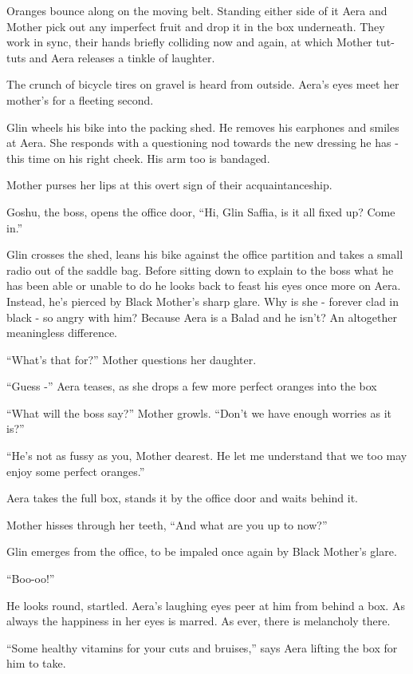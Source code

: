 \documentclass[twoside,11pt]{book}
\begin{document}
Oranges bounce along on the moving belt. Standing either side of it Aera and Mother pick out any imperfect fruit and
drop it in the box underneath. They work in sync, their hands briefly colliding now and again, at which Mother tut-tuts
and Aera releases a tinkle of laughter.

The crunch of bicycle tires on gravel is heard from outside. Aera's eyes meet her mother's for a fleeting second.

Glin wheels his bike into the packing shed. He removes his earphones and smiles at Aera. She responds with a questioning
nod towards the new dressing he has - this time on his right cheek. His arm too is bandaged.

Mother purses her lips at this overt sign of their acquaintanceship.

Goshu, the boss, opens the office door, ``Hi, Glin Saffia, is it all fixed up? Come in.''

Glin crosses the shed, leans his bike against the office partition and takes a small radio out of the saddle bag. Before
sitting down to explain to the boss what he has been able or unable to do he looks back to feast his eyes once more on
Aera. Instead, he's pierced by Black Mother's sharp glare. Why is she - forever clad in black - so angry with him?
Because Aera is a Balad and he isn't? An altogether meaningless difference.

``What's that for?'' Mother questions her daughter.

``Guess -'' Aera teases, as she drops a few more perfect oranges into the box

``What will the boss say?'' Mother growls. ``Don't we have enough worries as it
is?''

``He's not as fussy as you, Mother dearest. He let me understand that we too may enjoy some perfect
oranges.''

Aera takes the full box, stands it by the office door and waits behind it.

Mother hisses through her teeth, ``And what are you up to now?''

Glin emerges from the office, to be impaled once again by Black Mother's glare.

``Boo-oo!''

He looks round, startled. Aera's laughing eyes peer at him from behind a box. As always the happiness in her eyes is
marred. As ever, there is melancholy there.

``Some healthy vitamins for your cuts and bruises,'' says Aera lifting the box for him to
take.
\end{document}
